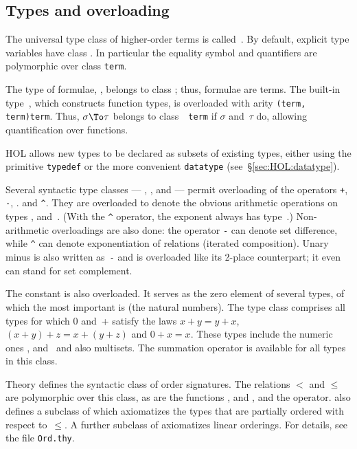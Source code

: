 \subsection{Types and overloading}
The universal type class of higher-order terms is called~.
By default, explicit type variables have class .  In
particular the equality symbol and quantifiers are polymorphic over
class \texttt{term}.

The type of formulae, , belongs to class ; thus,
formulae are terms.  The built-in type~, which constructs
function types, is overloaded with arity {\tt(term,\thinspace
  term)\thinspace term}.  Thus, $\sigma\To\tau$ belongs to class~{\tt
  term} if $\sigma$ and~$\tau$ do, allowing quantification over
functions.

HOL allows new types to be declared as subsets of existing types,
either using the primitive \texttt{typedef} or the more convenient
\texttt{datatype} (see~{\S}\ref{sec:HOL:datatype}).

Several syntactic type classes --- , ,
 and
 --- permit overloading of the operators {\tt+}, {\tt-}, {\tt*}. 
and \verb|^|. 
%
They are overloaded to denote the obvious arithmetic operations on types
,  and~. (With the \verb|^| operator, the
exponent always has type~.)  Non-arithmetic overloadings are also
done: the operator {\tt-} can denote set difference, while \verb|^| can
denote exponentiation of relations (iterated composition).  Unary minus is
also written as~{\tt-} and is overloaded like its 2-place counterpart; it even
can stand for set complement.

The constant  is also overloaded.  It serves as the zero element of
several types, of which the most important is  (the natural
numbers).  The type class  comprises all types for which 0
and~+ satisfy the laws $x+y=y+x$, $(x+y)+z = x+(y+z)$ and $0+x = x$.  These
types include the numeric ones ,  and~ and also
multisets.  The summation operator  is available for all types in
this class. 

Theory  defines the syntactic class  of order
signatures.  The relations $<$ and $\leq$ are polymorphic over this
class, as are the functions ,  and , and
the  operator.  also defines a subclass
 of  which axiomatizes the types that are partially
ordered with respect to~$\leq$.  A further subclass  of
 axiomatizes linear orderings.
For details, see the file \texttt{Ord.thy}.
                                          
